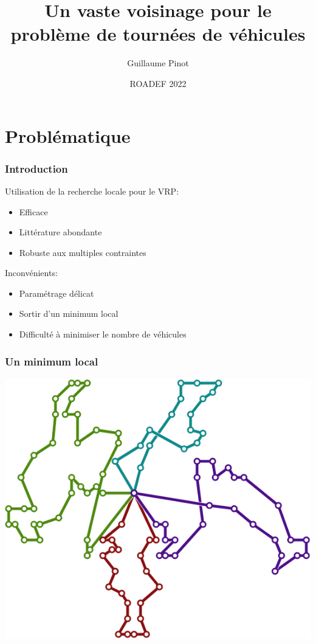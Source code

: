 \documentclass[table]{beamer}
\title[Un vaste voisinage pour le VRP]{Un vaste voisinage pour le problème de tournées de véhicules}
\author{Guillaume Pinot}
\institute%
{ Kardinal, Paris, France }
\date{ROADEF 2022}
\begin{document}
\begin{frame}
  \titlepage
\end{frame}


\section{Problématique}

\begin{frame}
  \frametitle{Introduction}

  Utilisation de la recherche locale pour le VRP:
  \begin{itemize}
  \item Efficace
  \item Littérature abondante
  \item Robuste aux multiples contraintes
  \end{itemize}

  Inconvénients:
  \begin{itemize}
  \item Paramétrage délicat
  \item Sortir d'un minimum local
  \item Difficulté à minimiser le nombre de véhicules
  \end{itemize}
\end{frame}

\begin{frame}
  \frametitle{Un minimum local}

  \centering
  \includegraphics[width=0.7\linewidth]{../article/images/C203-2}
\end{frame}
\end{document}
